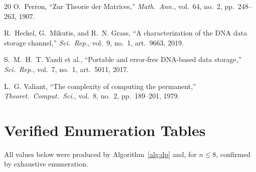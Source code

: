 \documentclass[a4paper,12pt]{article}
\begin{document}
\begin{thebibliography}{20}
O.~Perron,
``Zur Theorie der Matrices,''
\textit{Math.\ Ann.}, vol.~64, no.~2, pp.~248--263, 1907.

R.~Heckel, G.~Mikutis, and R.~N. Grass,
``A characterization of the DNA data storage channel,''
\textit{Sci.\ Rep.}, vol.~9, no.~1, art.~9663, 2019.

S.~M.~H.~T. Yazdi et al.,
``Portable and error-free DNA-based data storage,''
\textit{Sci.\ Rep.}, vol.~7, no.~1, art.~5011, 2017.

L.~G. Valiant,
``The complexity of computing the permanent,''
\textit{Theoret.\ Comput.\ Sci.}, vol.~8, no.~2, pp.~189--201, 1979.

\end{thebibliography}

\appendix

\section{Verified Enumeration Tables}
\label{app:table}

All values below were produced by Algorithm~\ref{alg:dp} and, for
$n\le8$, confirmed by exhaustive enumeration.
\end{document}
